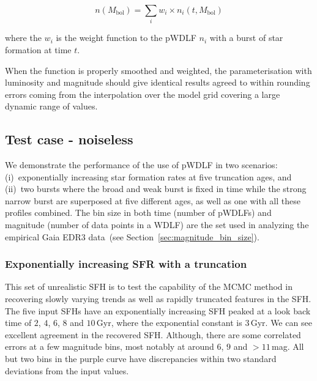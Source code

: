 \documentclass[fleqn,usenatbib]{mnras}
\begin{document}
\begin{equation}
    n(M_\mathrm{bol}) = \sum_i w_i \times n_i(t, M_\mathrm{bol})    
\end{equation}

where the $w_i$ is the weight function to the pWDLF $n_i$ with a burst of star
formation at time $t$.

When the function is properly smoothed and weighted, the parameterisation with
luminosity and magnitude should give identical results agreed to within
rounding errors coming from the interpolation over the model grid covering a
large dynamic range of values.

\subsection{Test case - noiseless}

We demonstrate the performance of the use of pWDLF in two scenarios:
(i)~exponentially increasing star formation rates at five truncation ages, and
(ii)~two bursts where the broad and weak burst is fixed in time while the strong
narrow burst are superposed at five different ages, as well as one with all
these profiles combined. The bin size in both time (number of pWDLFs) and
magnitude (number of data points in a WDLF) are the set used in analyzing the
empirical Gaia EDR3 data~(see Section~\ref{sec:magnitude_bin_size}).

\subsubsection*{Exponentially increasing SFR with a truncation}
This set of unrealistic SFH is to test the capability of the MCMC method in
recovering slowly varying trends as well as rapidly truncated features in the SFH.
The five input SFHs have an exponentially increasing SFH peaked at a look back
time of $2$, $4$, $6$, $8$ and $10$\,Gyr, where the exponential constant is
$3$\,Gyr. We can see excellent agreement in the recovered SFH. Although, there
are some correlated errors at a few magnitude bins, most notably at around $6$,
$9$ and $>11$\,mag. All but two bins in the purple curve have discrepancies
within two standard deviations from the input values. 
\end{document}
